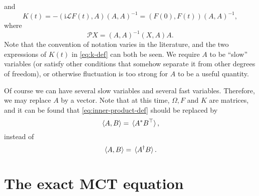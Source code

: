 \documentclass[hyperref, a4paper]{article}
\newcommand*{\ii}{\mathrm{i}}
\begin{document}
and 
\begin{equation}
    K(t)=- (\ii \mathcal{L} F(t),A)(A,A)^{-1} = (F(0), F(t)) (A,A)^{-1},
    \label{eq:k-def}
\end{equation}
where 
\begin{equation}
    \mathcal{P} X=(A,A)^{-1}(X,A)A.
\end{equation}
Note that the convention of notation varies in the literature, and the two expressions of $K(t)$ in \eqref{eq:k-def}
can both be seen. We require $A$ to be ``slow'' variables (or satisfy other conditions that somehow separate it 
from other degrees of freedom), or otherwise fluctuation is too strong for $A$ to be a useful quantity.

Of course we can have several slow variables and several fast variables. Therefore, we may replace $A$ by a vector. 
Note that at this time, $\Omega, F$ and $K$ are matrices, and it can be found that \eqref{eq:inner-product-def}
should be replaced by 
\begin{equation}
    \expval*{A, B} = \expval*{A^* B^\top},
\end{equation} 
instead of 
\[
    \expval*{A, B} = \expval*{A^\dagger B}.
\]

\section{The exact MCT equation} 
\end{document}
